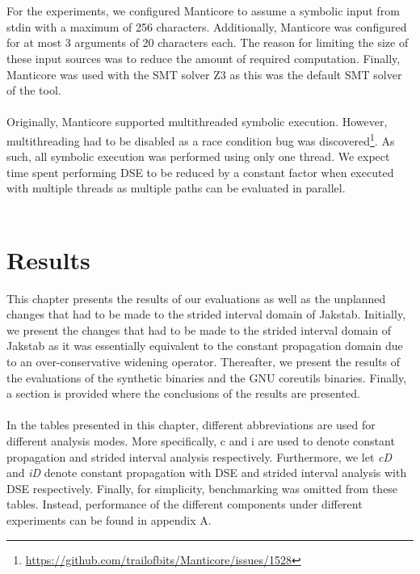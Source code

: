 \documentclass{kththesis}
\newcommand{\fbcomment}[1]{{#1}}
\renewcommand{\fbcomment}[1]{}
\renewcommand{\it}[1]{\textit{#1}}
\begin{document}
\\ \\
For the experiments, we configured Manticore to assume a symbolic input from stdin with a maximum of 256 characters. Additionally, Manticore was configured for at most 3 arguments of 20 characters each. The reason for limiting the size of these input sources was to reduce the amount of required computation. Finally, Manticore was used with the SMT solver Z3 as this was the default SMT solver of the tool.
\\ \\
Originally, Manticore supported multithreaded symbolic execution. However, multithreading had to be disabled as a race condition bug was discovered\footnote{\url{https://github.com/trailofbits/Manticore/issues/1528}}. As such, all symbolic execution was performed using only one thread. We expect time spent performing DSE to be reduced by a constant factor when executed with multiple threads as multiple paths can be evaluated in parallel.
\\ \\

\chapter{Results}\label{chap:results}
\fbcomment{\color{red}Goal: Present the most "interesting" results of the project(Full tables will be put in an appendix).}
This chapter presents the results of our evaluations as well as the unplanned changes that had to be made to the strided interval domain of Jakstab. Initially, we present the changes that had to be made to the strided interval domain of Jakstab as it was essentially equivalent to the constant propagation domain due to an over-conservative widening operator. Thereafter, we present the results of the evaluations of the synthetic binaries and the GNU coreutils binaries. Finally, a section is provided where the conclusions of the results are presented.
\\ \\
In the tables presented in this chapter, different abbreviations are used for different analysis modes. More specifically, c and i are used to denote constant propagation and strided interval analysis respectively. Furthermore, we let \it{cD} and \it{iD} denote constant propagation with DSE and strided interval analysis with DSE respectively. Finally, for simplicity, benchmarking was omitted from these tables. Instead, performance of the different components under different experiments can be found in appendix A.
\end{document}
